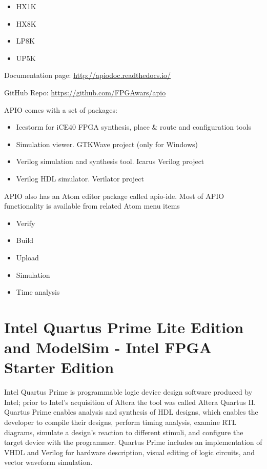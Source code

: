 \begin{itemize}
\item HX1K
\item HX8K
\item LP8K
\item UP5K
\end{itemize}

Documentation page: \url{http://apiodoc.readthedocs.io/}

GitHub Repo: \url{https://github.com/FPGAwars/apio}

APIO comes with a set of packages:

\begin{itemize}
\item Icestorm for iCE40 FPGA synthesis, place \& route and configuration tools
\item Simulation viewer. GTKWave project (only for Windows)
\item Verilog simulation and synthesis tool. Icarus Verilog project
\item Verilog HDL simulator. Verilator project
\end{itemize}

APIO also has an Atom editor package called apio-ide. Most of APIO functionality is available from related Atom menu items

\begin{itemize}
\item Verify
\item Build
\item Upload
\item Simulation
\item Time analysis
\end{itemize}


\section{Intel Quartus Prime Lite Edition and ModelSim - Intel FPGA Starter Edition}
Intel Quartus Prime is programmable logic device design software produced by Intel; prior to Intel's acquisition of Altera the tool was called Altera Quartus II. Quartus Prime enables analysis and synthesis of HDL designs, which enables the developer to compile their designs, perform timing analysis, examine RTL diagrams, simulate a design's reaction to different stimuli, and configure the target device with the programmer. Quartus Prime includes an implementation of VHDL and Verilog for hardware description, visual editing of logic circuits, and vector waveform simulation.\cite{Wikipedia_Quartus}

